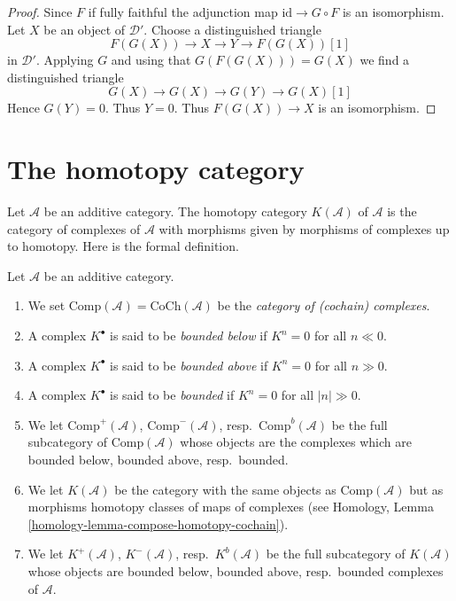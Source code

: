 \begin{proof}
Since $F$ if fully faithful the adjunction map $\text{id} \to G \circ F$
is an isomorphism. Let $X$ be an object of $\mathcal{D}'$.
Choose a distinguished triangle
$$
F(G(X)) \to X \to Y \to F(G(X))[1]
$$
in $\mathcal{D}'$. Applying $G$ and using that $G(F(G(X))) = G(X)$
we find a distinguished triangle
$$
G(X) \to G(X) \to G(Y) \to G(X)[1]
$$
Hence $G(Y) = 0$. Thus $Y = 0$. Thus $F(G(X)) \to X$ is an isomorphism.
\end{proof}









\section{The homotopy category}
\label{section-homotopy}

\noindent
Let $\mathcal{A}$ be an additive category. The homotopy category
$K(\mathcal{A})$ of $\mathcal{A}$ is the category of complexes of
$\mathcal{A}$ with morphisms given by morphisms of complexes up to homotopy.
Here is the formal definition.

\begin{definition}
\label{definition-complexes-notation}
Let $\mathcal{A}$ be an additive category.
\begin{enumerate}
\item We set $\text{Comp}(\mathcal{A}) = \text{CoCh}(\mathcal{A})$
be the {\it category of (cochain) complexes}.
\item A complex $K^\bullet$ is said to be
{\it bounded below} if $K^n = 0$ for all $n \ll 0$.
\item A complex $K^\bullet$ is said to be
{\it bounded above} if $K^n = 0$ for all $n \gg 0$.
\item A complex $K^\bullet$ is said to be
{\it bounded} if $K^n = 0$ for all $|n| \gg 0$.
\item We let
$\text{Comp}^{+}(\mathcal{A})$, $\text{Comp}^{-}(\mathcal{A})$,
resp.\ $\text{Comp}^b(\mathcal{A})$ be the full subcategory
of $\text{Comp}(\mathcal{A})$ whose objects are the complexes
which are bounded below, bounded above, resp.\ bounded.
\item We let $K(\mathcal{A})$ be the category with the same objects
as $\text{Comp}(\mathcal{A})$ but as morphisms homotopy classes of
maps of complexes (see
Homology, Lemma \ref{homology-lemma-compose-homotopy-cochain}).
\item We let $K^{+}(\mathcal{A})$, $K^{-}(\mathcal{A})$,
resp.\ $K^b(\mathcal{A})$ be the full subcategory of $K(\mathcal{A})$
whose objects are bounded below, bounded above, resp.\ bounded
complexes of $\mathcal{A}$.
\end{enumerate}
\end{definition}

